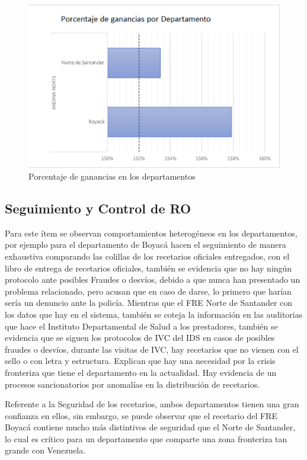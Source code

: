 \documentclass[
]{book}
\begin{document}
\begin{figure}
\includegraphics[width=0.85\linewidth]{figures/Imagen4} \caption{Porcentaje de ganancias en los departamentos}\label{fig:PorcGananciasDepto}
\end{figure}

\hypertarget{seguimiento-y-control-de-ro}{%
\subsection{Seguimiento y Control de RO}\label{seguimiento-y-control-de-ro}}

Para este ítem se observan comportamientos heterogéneos en los departamentos, por ejemplo para el departamento de Boyacá hacen el seguimiento de manera exhaustiva comparando las colillas de los recetarios oficiales entregados, con el libro de entrega de recetarios oficiales, también se evidencia que no hay ningún protocolo ante posibles Fraudes o desvíos, debido a que nunca han presentado un problema relacionado, pero acusan que en caso de darse, lo primero que harían sería un denuncio ante la policía. Mientras que el FRE Norte de Santander con los datos que hay en el sistema, también se coteja la información en las auditorias que hace el Instituto Departamental de Salud a los prestadores, también se evidencia que se siguen los protocolos de IVC del IDS en casos de posibles fraudes o desvíos, durante las visitas de IVC, hay recetarios que no vienen con el sello o con letra y estructura. Explican que hay una necesidad por la crisis fronteriza que tiene el departamento en la actualidad. Hay evidencia de un procesos sancionatorios por anomalías en la distribución de recetarios.

Referente a la Seguridad de los recetarios, ambos departamentos tienen una gran confianza en ellos, sin embargo, se puede observar que el recetario del FRE Boyacá contiene mucho más distintivos de seguridad que el Norte de Santander, lo cual es crítico para un departamento que comparte una zona fronteriza tan grande con Venezuela.
\end{document}

